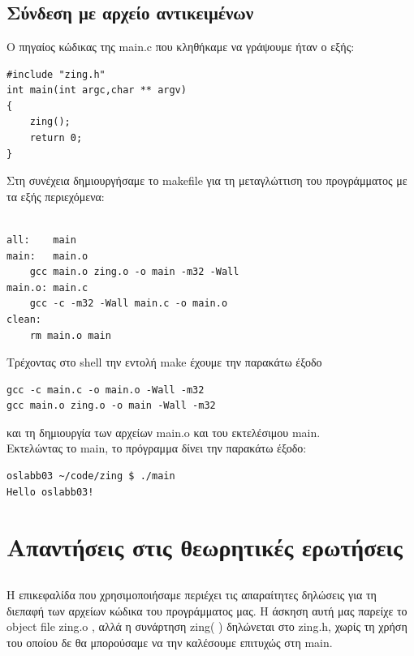 \documentclass[a4paper,10pt]{article} \usepackage{anysize}
\begin{document}


\section*{} \setcounter{section}{1}
\subsection{Σύνδεση με αρχείο αντικειμένων} Ο πηγαίος κώδικας της main.c που
κληθήκαμε να γράψουμε ήταν ο εξής:

\begin{verbatim}
#include "zing.h"
int main(int argc,char ** argv)
{
	zing();
	return 0;
}
\end{verbatim}

Στη συνέχεια δημιουργήσαμε το makefile για  τη μεταγλώττιση του προγράμματος
με τα εξής περιεχόμενα:

\begin{verbatim}

all:	main
main:	main.o
	gcc main.o zing.o -o main -m32 -Wall
main.o:	main.c
	gcc -c -m32 -Wall main.c -o main.o
clean:
	rm main.o main

\end{verbatim}
Τρέχοντας στο shell την εντολή make έχουμε την παρακάτω έξοδο
\begin{verbatim}
gcc -c main.c -o main.o -Wall -m32
gcc main.o zing.o -o main -Wall -m32
\end{verbatim}
και τη δημιουργία των αρχείων main.o και του εκτελέσιμου main.\\
Εκτελώντας το main, το πρόγραμμα δίνει την παρακάτω έξοδο:
\begin{verbatim}
oslabb03 ~/code/zing $ ./main
Hello oslabb03!
\end{verbatim}


\pagebreak
\section*{Απαντήσεις στις θεωρητικές ερωτήσεις}\setcounter{section}{2}
\subsection{}
Η επικεφαλίδα που χρησιμοποιήσαμε περιέχει τις απαραίτητες  δηλώσεις για τη
διεπαφή των αρχείων κώδικα του προγράμματος μας. 
Η άσκηση αυτή μας παρείχε το object file zing.o , αλλά η συνάρτηση zing( )
δηλώνεται στο zing.h, χωρίς τη χρήση του οποίου δε θα μπορούσαμε να την
καλέσουμε επιτυχώς στη main.
\end{document}
